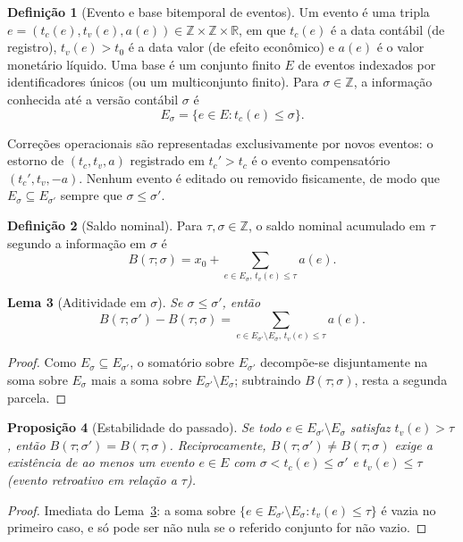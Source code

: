\documentclass[11pt, a4paper]{article}
\theoremstyle{definition}
\newtheorem{definicao}{Definição}[section]
\theoremstyle{plain}
\newtheorem{lema}[definicao]{Lema}
\newtheorem{proposicao}[definicao]{Proposição}
\theoremstyle{remark}
\begin{document}
\begin{definicao}[Evento e base bitemporal de eventos]\label{def:1.1}
Um evento é uma tripla $e = (t_c(e), t_v(e), a(e)) \in \mathbb{Z} \times \mathbb{Z} \times \mathbb{R}$, em que $t_c(e)$ é a data contábil (de registro), $t_v(e) > t_0$ é a data valor (de efeito econômico) e $a(e)$ é o valor monetário líquido. Uma base é um conjunto finito $E$ de eventos indexados por identificadores únicos (ou um multiconjunto finito). Para $\sigma \in \mathbb{Z}$, a informação conhecida até a versão contábil $\sigma$ é
\[
E_\sigma = \{e \in E : t_c(e) \le \sigma\}.
\]
\end{definicao}

Correções operacionais são representadas exclusivamente por novos eventos: o estorno de $(t_c, t_v, a)$ registrado em $t_c' > t_c$ é o evento compensatório $(t_c', t_v, -a)$. Nenhum evento é editado ou removido fisicamente, de modo que $E_\sigma \subseteq E_{\sigma'}$ sempre que $\sigma \le \sigma'$.

\begin{definicao}[Saldo nominal]\label{def:1.2}
Para $\tau, \sigma \in \mathbb{Z}$, o saldo nominal acumulado em $\tau$ segundo a informação em $\sigma$ é
\[
B(\tau; \sigma) = x_0 + \sum_{e \in E_\sigma,\, t_v(e) \le \tau} a(e).
\]
\end{definicao}

\begin{lema}[Aditividade em $\sigma$]\label{lem:1.3}
Se $\sigma \le \sigma'$, então
\[
B(\tau; \sigma') - B(\tau; \sigma) = \sum_{e \in E_{\sigma'} \setminus E_\sigma,\, t_v(e) \le \tau} a(e).
\]
\end{lema}
\begin{proof}
Como $E_\sigma \subseteq E_{\sigma'}$, o somatório sobre $E_{\sigma'}$ decompõe-se disjuntamente na soma sobre $E_\sigma$ mais a soma sobre $E_{\sigma'} \setminus E_\sigma$; subtraindo $B(\tau; \sigma)$, resta a segunda parcela.
\end{proof}

\begin{proposicao}[Estabilidade do passado]\label{prop:1.4}
Se todo $e \in E_{\sigma'} \setminus E_\sigma$ satisfaz $t_v(e) > \tau$, então $B(\tau; \sigma') = B(\tau; \sigma)$. Reciprocamente, $B(\tau; \sigma') \neq B(\tau; \sigma)$ exige a existência de ao menos um evento $e \in E$ com $\sigma < t_c(e) \le \sigma'$ e $t_v(e) \le \tau$ (evento retroativo em relação a $\tau$).
\end{proposicao}
\begin{proof}
Imediata do Lema~\ref{lem:1.3}: a soma sobre $\{e \in E_{\sigma'} \setminus E_\sigma : t_v(e) \le \tau\}$ é vazia no primeiro caso, e só pode ser não nula se o referido conjunto for não vazio.
\end{proof}
\end{document}
